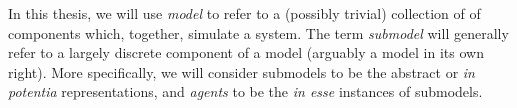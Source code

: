 









In this thesis, we will use \emph{model} to refer to a (possibly
trivial) collection of of components which, together, simulate a
system. The term \emph{submodel} will generally refer to a largely
discrete component of a model (arguably a model in its own right).
More specifically, we will consider submodels to be the abstract or
\emph{in potentia} representations, and \emph{agents} to be the
\emph{in esse} instances of submodels.

